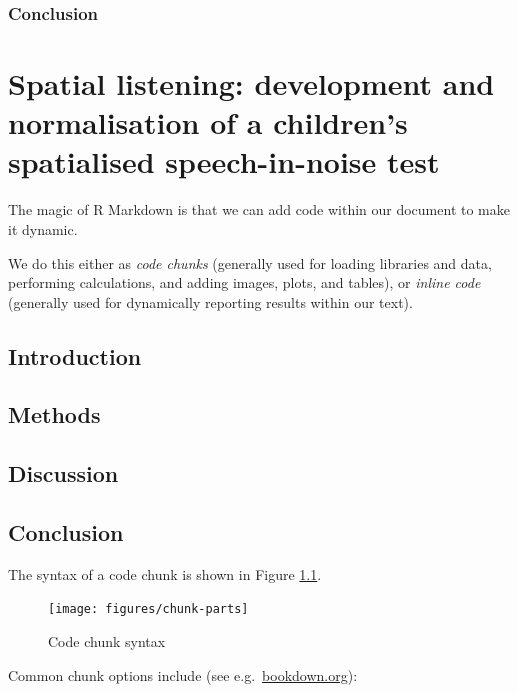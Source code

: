 \documentclass[a4paper, twoside]{templates/ociamthesis}
\begin{document}
\hypertarget{conclusion}{%
\subsection{Conclusion}\label{conclusion}}

\hypertarget{Chpt2}{%
\chapter{Spatial listening: development and normalisation of a children's spatialised speech-in-noise test}\label{Chpt2}}

\minitoc 

The magic of R Markdown is that we can add code within our document to make it dynamic.

We do this either as \emph{code chunks} (generally used for loading libraries and data, performing calculations, and adding images, plots, and tables), or \emph{inline code} (generally used for dynamically reporting results within our text).

\hypertarget{introduction-3}{%
\section{Introduction}\label{introduction-3}}

\hypertarget{methods-3}{%
\section{Methods}\label{methods-3}}

\hypertarget{discussion-3}{%
\section{Discussion}\label{discussion-3}}

\hypertarget{conclusion-1}{%
\section{Conclusion}\label{conclusion-1}}

The syntax of a code chunk is shown in Figure \ref{fig:chunk-parts}.

\begin{figure}
\texttt{[image: figures/chunk-parts]} \caption{Code chunk syntax}\label{fig:chunk-parts}
\end{figure}

Common chunk options include (see e.g.~\href{https://bookdown.org/yihui/rmarkdown/r-code.html}{bookdown.org}):
\end{document}
